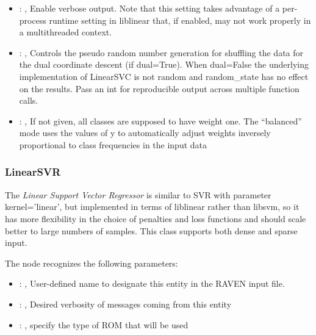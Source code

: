 \begin{itemize}
    \item {}: , 
      Enable verbose output. Note that this setting takes advantage
      of a per-process runtime setting in liblinear that, if enabled, may not
      work properly in a multithreaded context.

    \item {}: , 
      Controls the pseudo random number generation for shuffling
      the data for the dual coordinate descent (if dual=True). When dual=False
      the underlying implementation of LinearSVC is not random and
      random\_state has no effect on the results. Pass an int for reproducible
      output across multiple function calls.

    \item {}: \xmlDesc{[balanced]}, 
      If not given, all classes are supposed to have weight one.
      The “balanced” mode uses the values of y to automatically adjust weights
      inversely proportional to class frequencies in the input data
  \end{itemize}


\subsubsection{LinearSVR}
  The  \textit{Linear Support Vector Regressor} is
  similar to SVR with parameter kernel=’linear’, but implemented in terms of liblinear rather than
  libsvm,                             so it has more flexibility in the choice of penalties and loss
  functions and should scale better to large numbers of samples.                             This
  class supports both dense and sparse input.

  The  node recognizes the following parameters:
    \begin{itemize}
      \item {}: , 
        User-defined name to designate this entity in the RAVEN input file.
      \item {}: , 
        Desired verbosity of messages coming from this entity
      \item {}: , 
        specify the type of ROM that will be used
  \end{itemize}

